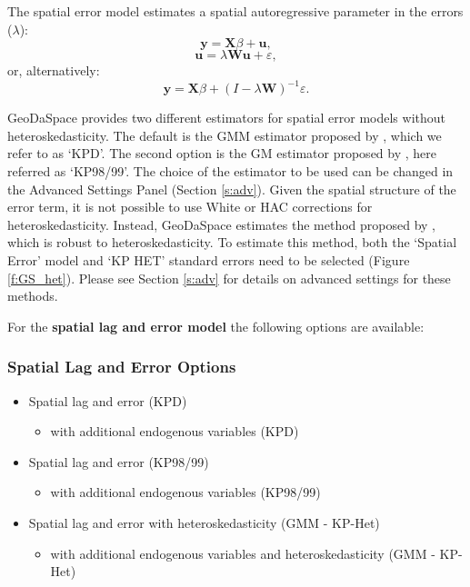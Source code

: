 \documentclass{article}
\begin{document}
The spatial error model estimates a spatial autoregressive parameter in the errors ($\lambda$):
\begin{equation}
\mathbf{y} =  \mathbf{X}\beta + \mathbf{u},
\end{equation}
\begin{equation}
\mathbf{u} =  \lambda \mathbf{W} \mathbf{u} + \varepsilon,
\end{equation}
or, alternatively:
\begin{equation}
\mathbf{y} =  \mathbf{X}\beta + (I - \lambda \mathbf{W})^{-1} \varepsilon.
\end{equation}

GeoDaSpace provides two different estimators for spatial error models without heteroskedasticity. The default is the GMM estimator proposed by \citet{Drukker10}, which we refer to as `KPD'. The second option is the GM estimator proposed by \citet{Kelejian98,Kelejian99}, here referred as `KP98/99'. The choice of the estimator to be used can be changed in the Advanced Settings Panel (Section \ref{s:adv}). Given the spatial structure of the error term, it is not possible to use White or HAC corrections for heteroskedasticity. Instead, GeoDaSpace estimates the method proposed by \citet{Arraiz10}, which is robust to heteroskedasticity. To estimate this method, both the `Spatial Error' model and `KP HET' standard errors need to be selected (Figure \ref{f:GS_het}). Please see Section \ref{s:adv} for details on advanced settings for these methods.
\FloatBarrier

For the \textbf{spatial lag and error model} the following options are available:

\subsubsection*{Spatial Lag and Error Options}
\begin{itemize}
\item Spatial lag and error (KPD)
	\begin{itemize}
	\item with additional endogenous variables (KPD)
	\end{itemize}
\item Spatial lag and error (KP98/99)
	\begin{itemize}
	\item with additional endogenous variables (KP98/99)
	\end{itemize}
\item Spatial lag and error with heteroskedasticity (GMM - KP-Het)
	\begin{itemize}
	\item with additional endogenous variables and heteroskedasticity (GMM - KP-Het)
	\end{itemize}
\end{itemize}
\end{document}
